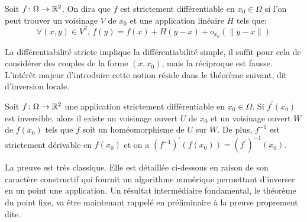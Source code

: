\begin{fdefn}\label{def:strict_diff}
Soit $f \colon \Omega \to \mathbb R^2$. On dira que $f$ est strictement différentiable en $x_0 \in \Omega$ si l'on peut trouver un voisinage $V$ de $x_0$ et une application linéaire $H$ tels que:
\[
\forall (x,y) \in V^2, \, f(y) = f(x) + H(y-x) + o_{x_0}\left(\|y-x\|\right)
\]
\end{fdefn}

La différentiabilité stricte implique la différentiabilité simple, il suffit pour cela de considérer des couples de la forme $(x,x_0)$, mais la réciproque est fausse. L'intérêt majeur d'introduire cette notion réside dans le théorème suivant, dit d'inversion locale.

\begin{fthm}
Soit $f \colon \Omega \to \mathbb R^2$ une application strictement différentiable en $x_0 \in \Omega$. 
Si $f^\prime(x_0)$ est inversible, alors il existe un voisinage ouvert $U$ de $x_0$ et un voisinage ouvert $W$ de $f(x_0)$ 
tels que $f$ soit un homéomorphisme de $U$ sur $W$. De plus, $f^{-1}$ est strictement dérivable en $f(x_0)$ et on 
a $\left( f^{-1} \right)^\prime(f(x_0)) = \left(f^{\prime}\right)^{-1}(x_0)$.
\end{fthm}
La preuve est très classique. Elle est détaillée ci-dessous en raison de son caractère constructif qui fournit un algorithme numérique permettant d'inverser en un point une application. Un résultat intermédiaire fondamental, le théorème du point fixe, va être maintenant rappelé en préliminaire à la preuve proprement dite.

